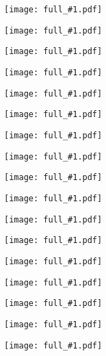 \documentclass[landscape,a4paper]{article}
\newcommand{\image}[1]{
\begin{figure}
\texttt{[image: full\_\#1.pdf]}
\end{figure}
}
\begin{document}
\image{000_title}
\image{010_he}
\image{020_he_phase}
\image{030_sup_he3}
\image{040_phase1}
\image{050_phase2}
\image{052_ph2_modes}
\image{054_ph2_waves}
\image{060_ferro}
\image{070_he3_order}
\image{080_he3_modes}
\image{081_he3_modes1}
\image{090_spinwaves}
\image{100_leggett_eq}
\image{110_linear_nmr}
\image{120_hpd}
\image{999_black}
\end{document}

